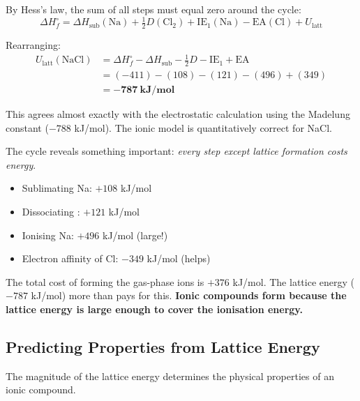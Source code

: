 \documentclass[12pt, a4paper]{book}
\begin{document}
\vspace{0.4em}

By Hess's law, the sum of all steps must equal zero
around the cycle:
\[
  \Delta H_f^\circ = \Delta H_\text{sub}(\text{Na})
  + \tfrac{1}{2}D(\text{Cl}_2)
  + \text{IE}_1(\text{Na})
  - \text{EA}(\text{Cl})
  + U_\text{latt}
\]

Rearranging:
\begin{align*}
  U_\text{latt}(\text{NaCl})
  &= \Delta H_f^\circ - \Delta H_\text{sub} - \tfrac{1}{2}D
     - \text{IE}_1 + \text{EA} \\
  &= (-411) - (108) - (121) - (496) + (349) \\
  &= \mathbf{-787\ \text{kJ/mol}}
\end{align*}

This agrees almost exactly with the electrostatic calculation
using the Madelung constant ($-788$ kJ/mol).
The ionic model is quantitatively correct for NaCl.

\vspace{0.5em}

The cycle reveals something important:
\emph{every step except lattice formation costs energy}.
\begin{itemize}[nosep, leftmargin=2em]
  \item Sublimating Na: $+108$ kJ/mol
  \item Dissociating : $+121$ kJ/mol
  \item Ionising Na: $+496$ kJ/mol (large!)
  \item Electron affinity of Cl: $-349$ kJ/mol (helps)
\end{itemize}

The total cost of forming the gas-phase ions is
$+376$ kJ/mol.
The lattice energy ($-787$ kJ/mol) more than pays for this.
\textbf{Ionic compounds form because the lattice energy
is large enough to cover the ionisation energy.}

\subsection{Predicting Properties from Lattice Energy}

The magnitude of the lattice energy determines the
physical properties of an ionic compound.
\end{document}
